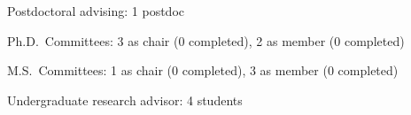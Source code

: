 \begin{tightItemize}
    \item Postdoctoral advising: 1 postdoc
    \item Ph.D.\ Committees: 3 as chair (0 completed), 2 as member (0 completed)
    \item M.S.\ Committees:  1 as chair (0 completed), 3 as member (0 completed)
    \item Undergraduate research advisor: 4 students
\end{tightItemize}
